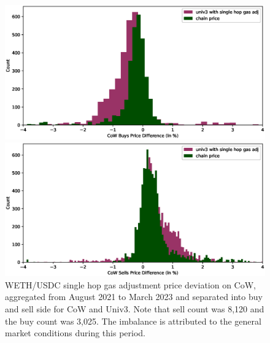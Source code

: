 \documentclass[a4paper,10pt]{article}
\theoremstyle{remark}
\begin{document}
\begin{figure}
  \begin{center}
    \begin{minipage}{.5\textwidth}
      \begin{center}
        \includegraphics[width=.9\textwidth]
          {diagrams/weth_buy_hist.eps}
      \end{center}
   \end{minipage}%
    \begin{minipage}{.5\textwidth}
      \begin{center}
        \includegraphics[width=.9\textwidth]
          {diagrams/weth_sell_hist.eps}
      \end{center}
    \end{minipage}
  \end{center}
  \caption{WETH/USDC single hop gas adjustment price deviation on CoW, aggregated from August 2021 to March 2023 and separated into buy and sell side for CoW and Univ3. Note that sell count was 8,120 and the buy count was 3,025. The imbalance is attributed to the general market conditions during this period.}
\end{figure}
\end{document}
